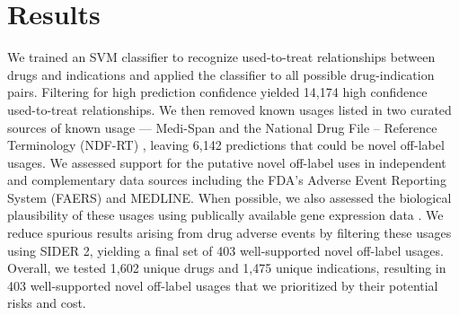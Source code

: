 \section{Results}
We trained an SVM classifier to recognize used-to-treat relationships
between drugs and indications and applied the classifier to all
possible drug-indication pairs.  Filtering for high prediction
confidence yielded 14,174 high confidence used-to-treat
relationships. We then removed known usages listed in two curated
sources of known usage — Medi-Span and the National Drug File –
Reference Terminology (NDF-RT) \cite{Brown2004}, leaving 6,142
predictions that could be novel off-label usages.  We assessed support
for the putative novel off-label uses in independent and complementary
data sources including the FDA’s Adverse Event Reporting System
(FAERS) and MEDLINE.  When possible, we also assessed the biological
plausibility of these usages using publically available gene
expression data \cite{Sirota2011}.  We reduce spurious results arising
from drug adverse events by filtering these usages using SIDER 2,
yielding a final set of 403 well-supported novel off-label
usages. Overall, we tested 1,602 unique drugs and 1,475 unique
indications, resulting in 403 well-supported novel off-label usages
that we prioritized by their potential risks and cost.

